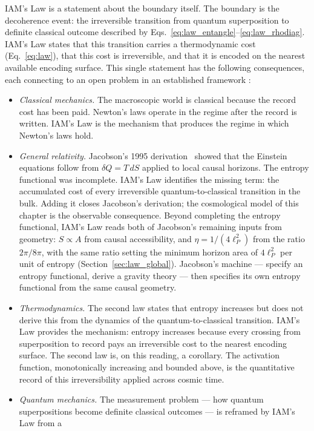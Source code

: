 IAM's Law is a statement about the boundary itself. The boundary is the decoherence event: the irreversible transition from quantum superposition to
definite classical outcome described by Eqs.~\eqref{eq:law_entangle}--\eqref{eq:law_rhodiag}. IAM's Law states that this transition carries a thermodynamic
cost (Eq.~\eqref{eq:law}), that this cost is irreversible, and that it is encoded on the nearest available encoding surface. This single statement has the
following consequences, each connecting to an open problem in an established framework \interp:
\begin{itemize}
\item \emph{Classical mechanics.} The macroscopic world is classical because the record cost has been paid. Newton's laws operate in the regime after the
record is written. IAM's Law is the mechanism that produces the regime in which Newton's laws hold.
\item \emph{General relativity.} Jacobson's 1995 derivation~\cite{Jacobson1995} showed that the Einstein equations follow from $\delta Q=T\,dS$ applied to
local causal horizons. The entropy functional was incomplete. IAM's Law identifies the missing term: the accumulated cost of every irreversible
quantum-to-classical transition in the bulk. Adding it closes Jacobson's derivation; the cosmological model of this chapter is the observable consequence.
Beyond completing the entropy functional, IAM's Law reads both of Jacobson's remaining inputs from geometry: $S\propto A$ from causal accessibility, and
$\eta=1/(4\ell_P^2)$ from the ratio $2\pi/8\pi$, with the same ratio setting the minimum horizon area of $4\ell_P^2$ per unit of entropy
(Section~\ref{sec:law_global}). Jacobson's machine --- specify an entropy functional, derive a gravity theory --- then specifies its own entropy functional
from the same causal geometry.
\item \emph{Thermodynamics.} The second law states that entropy increases but does not derive this from the dynamics of the quantum-to-classical
transition. IAM's Law provides the mechanism: entropy increases because every crossing from superposition to record pays an irreversible cost to the
nearest encoding surface. The second law is, on this reading, a corollary. The activation function, monotonically increasing and bounded above, is the
quantitative record of this irreversibility applied across cosmic time.
\item \emph{Quantum mechanics.} The measurement problem --- how quantum superpositions become definite classical outcomes --- is reframed by IAM's Law from a

\end{itemize}
